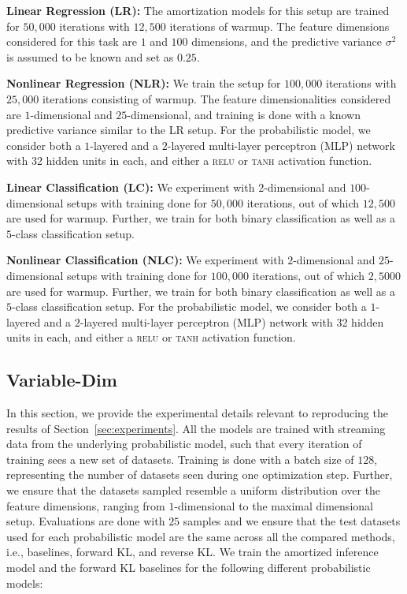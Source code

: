 \textbf{Linear Regression (LR):} The amortization models for this setup are trained for $50,000$ iterations with $12,500$ iterations of warmup. The feature dimensions considered for this task are $1$ and $100$ dimensions, and the predictive variance $\sigma^2$ is assumed to be known and set as $0.25$.

\textbf{Nonlinear Regression (NLR):} We train the setup for $100,000$ iterations with $25,000$ iterations consisting of warmup. The feature dimensionalities considered are $1$-dimensional and $25$-dimensional, and training is done with a known predictive variance similar to the LR setup. For the probabilistic model, we consider both a $1$-layered and a $2$-layered multi-layer perceptron (MLP) network with 32 hidden units in each, and either a \textsc{relu} or \textsc{tanh} activation function.

\textbf{Linear Classification (LC):} We experiment with $2$-dimensional and $100$-dimensional setups with training done for $50,000$ iterations, out of which $12,500$ are used for warmup. Further, we train for both binary classification as well as a $5$-class classification setup.

\textbf{Nonlinear Classification (NLC):} We experiment with $2$-dimensional and $25$-dimensional setups with training done for $100,000$ iterations, out of which $2,5000$ are used for warmup. Further, we train for both binary classification as well as a $5$-class classification setup. For the probabilistic model, we consider both a $1$-layered and a $2$-layered multi-layer perceptron (MLP) network with 32 hidden units in each, and either a \textsc{relu} or \textsc{tanh} activation function.



\subsection{Variable-Dim}
\label{appdx:details_max_dim}
In this section, we provide the experimental details relevant to reproducing the results of Section~\ref{sec:experiments}. All the models are trained with streaming data from the underlying probabilistic model, such that every iteration of training sees a new set of datasets. Training is done with a batch size of $128$, representing the number of datasets seen during one optimization step. Further, we ensure that the datasets sampled resemble a uniform distribution over the feature dimensions, ranging from $1$-dimensional to the maximal dimensional setup. Evaluations are done with $25$ samples and we ensure that the test datasets used for each probabilistic model are the same across all the compared methods, i.e., baselines, forward KL, and reverse KL. We train the amortized inference model and the forward KL baselines for the following different probabilistic models:

